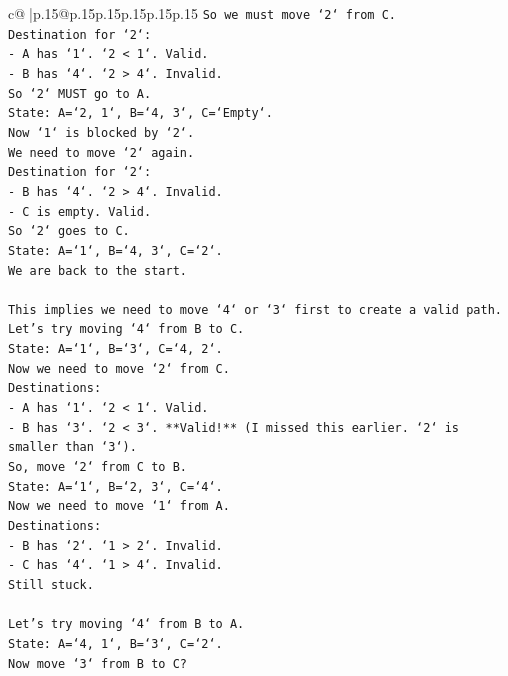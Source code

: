 \documentclass{article}
\begin{document}
{\begin{supertabular}{c@{$\;$}|p{.15\linewidth}@{}p{.15\linewidth}p{.15\linewidth}p{.15\linewidth}p{.15\linewidth}p{.15\linewidth}}
{{{\texttt{So we must move `2` from C.} \\
\texttt{Destination for `2`:} \\
\texttt{{-} A has `1`. `2 < 1`. Valid.} \\
\texttt{{-} B has `4`. `2 > 4`. Invalid.} \\
\texttt{So `2` MUST go to A.} \\
\texttt{State: A=`2, 1`, B=`4, 3`, C=`Empty`.} \\
\texttt{Now `1` is blocked by `2`.} \\
\texttt{We need to move `2` again.} \\
\texttt{Destination for `2`:} \\
\texttt{{-} B has `4`. `2 > 4`. Invalid.} \\
\texttt{{-} C is empty. Valid.} \\
\texttt{So `2` goes to C.} \\
\texttt{State: A=`1`, B=`4, 3`, C=`2`.} \\
\texttt{We are back to the start.} \\
\\ 
\texttt{This implies we need to move `4` or `3` first to create a valid path.} \\
\texttt{Let's try moving `4` from B to C.} \\
\texttt{State: A=`1`, B=`3`, C=`4, 2`.} \\
\texttt{Now we need to move `2` from C.} \\
\texttt{Destinations:} \\
\texttt{{-} A has `1`. `2 < 1`. Valid.} \\
\texttt{{-} B has `3`. `2 < 3`. **Valid!** (I missed this earlier. `2` is smaller than `3`).} \\
\texttt{So, move `2` from C to B.} \\
\texttt{State: A=`1`, B=`2, 3`, C=`4`.} \\
\texttt{Now we need to move `1` from A.} \\
\texttt{Destinations:} \\
\texttt{{-} B has `2`. `1 > 2`. Invalid.} \\
\texttt{{-} C has `4`. `1 > 4`. Invalid.} \\
\texttt{Still stuck.} \\
\\ 
\texttt{Let's try moving `4` from B to A.} \\
\texttt{State: A=`4, 1`, B=`3`, C=`2`.} \\
\texttt{Now move `3` from B to C?} \\
}}}
\end{supertabular}}
\end{document}
